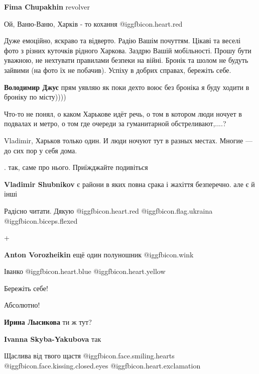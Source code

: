 \begin{itemize}
\textbf{Fima Chupakhin} revolver

Ой, Ваню-Ваню, Харків - то кохання @igg{fbicon.heart.red}


Дуже емоційно, яскраво та відверто. Радію Вашім почуттям. Цікаві та веселі фото
з різних куточків рідного Харкова. Заздрю Вашій мобільності. Прошу бути
уважною, не нехтувати правилами безпеки на війні. Бронік та шолом не будуть
зайвими (на фото їх не побачив). Успіху в добрих справах, бережіть себе.

\textbf{Володимир Джус} прям уявляю як поки дехто воює без броніка я буду ходити в броніку по місту))))


Что-то не понял, о каком Харькове идёт речь, о том в котором люди ночует в
подвалах и метро, о том где очереди за гуманитарной обстреливают,....?

\begin{itemize} %
Vladimir, Харьков только один. И люди ночуют тут в разных местах. Многие — до сих пор у себя дома.

. так, саме про нього. Приїжджайте подивіться

\textbf{Vladimir Shubnikov} є райони в яких повна срака і жахіття безперечно. але є й інші
\end{itemize} %

Радісно читати. Дякую @igg{fbicon.heart.red} @igg{fbicon.flag.ukraina}  @igg{fbicon.biceps.flexed} 

+

\textbf{Anton Vorozheikin} ещё один полуношник @igg{fbicon.wink} 

Іванко  @igg{fbicon.heart.blue}  @igg{fbicon.heart.yellow} 

Бережіть себе!

Абсолютно!

\textbf{Ирина Лысикова} ти ж тут?

\textbf{Ivanna Skyba-Yakubova} так

Щаслива від твого щастя @igg{fbicon.face.smiling.hearts}   @igg{fbicon.face.kissing.closed.eyes} 
@igg{fbicon.heart.exclamation}


\end{itemize}
